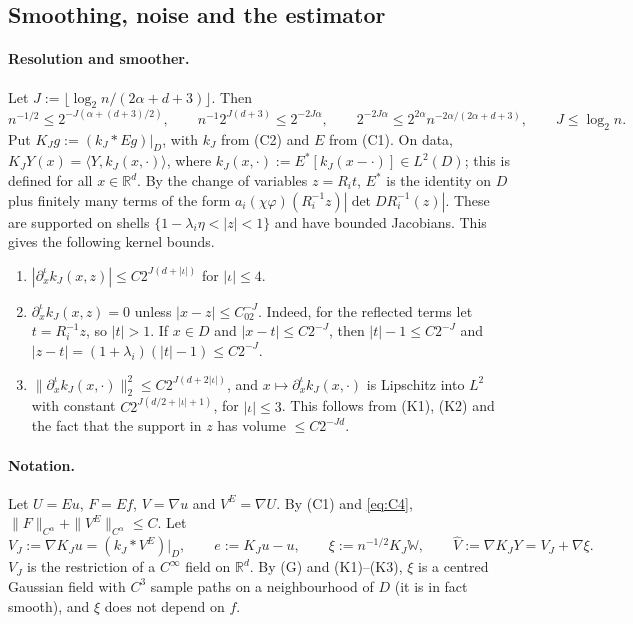 \documentclass[11pt]{article}
\theoremstyle{definition}
\theoremstyle{remark}
\newcommand{\R}{\mathbb R}
\newcommand{\W}{\mathbb W}
\newcommand{\rate}{n^{-2\alpha/(2\alpha+d+3)}}
\begin{document}
\subsection{Smoothing, noise and the estimator}

\paragraph{Resolution and smoother.} Let $J:=\lfloor\log_2n/(2\alpha+d+3)\rfloor$. Then
\begin{equation}\label{eq:J}
n^{-1/2}\le2^{-J(\alpha+(d+3)/2)},\qquad n^{-1}2^{J(d+3)}\le2^{-2J\alpha},\qquad 2^{-2J\alpha}\le 2^{2\alpha}\rate,\qquad J\le\log_2n .
\end{equation}
Put $K_Jg:=(k_J*Eg)|_D$, with $k_J$ from (C2) and $E$ from (C1). On data, $K_JY(x)=\langle Y,k_J(x,\cdot)\rangle$, where $k_J(x,\cdot):=E^*[k_J(x-\cdot)]\in L^2(D)$; this is defined for all $x\in\R^d$. By the change of variables $z=R_it$, $E^*$ is the identity on $D$ plus finitely many terms of the form $a_i(\chi\varphi)(R_i^{-1}z)|\det DR_i^{-1}(z)|$. These are supported on shells $\{1-\lambda_i\eta<|z|<1\}$ and have bounded Jacobians. This gives the following kernel bounds.
\begin{enumerate}[leftmargin=3.2em]
\item[\textbf{(K1)}] $|\partial^\iota_xk_J(x,z)|\le C2^{J(d+|\iota|)}$ for $|\iota|\le4$.
\item[\textbf{(K2)}] $\partial^\iota_xk_J(x,z)=0$ unless $|x-z|\le C_02^{-J}$. Indeed, for the reflected terms let $t=R_i^{-1}z$, so $|t|>1$. If $x\in D$ and $|x-t|\le C2^{-J}$, then $|t|-1\le C2^{-J}$ and $|z-t|=(1+\lambda_i)(|t|-1)\le C2^{-J}$.
\item[\textbf{(K3)}] $\|\partial^\iota_xk_J(x,\cdot)\|^2_2\le C2^{J(d+2|\iota|)}$, and $x\mapsto\partial_x^\iota k_J(x,\cdot)$ is Lipschitz into $L^2$ with constant $C2^{J(d/2+|\iota|+1)}$, for $|\iota|\le3$. This follows from (K1), (K2) and the fact that the support in $z$ has volume $\le C2^{-Jd}$.
\end{enumerate}


\paragraph{Notation.} Let $U=Eu$, $F=Ef$, $V=\nabla u$ and $V^E=\nabla U$. By (C1) and \eqref{eq:C4}, $\|F\|_{C^\alpha}+\|V^E\|_{C^\alpha}\le C$. Let
\[
V_J:=\nabla K_Ju=(k_J*V^E)|_D,\qquad e:=K_Ju-u,\qquad \xi:=n^{-1/2}K_J\W,\qquad\hat V:=\nabla K_JY=V_J+\nabla\xi .
\]
$V_J$ is the restriction of a $C^\infty$ field on $\R^d$. By (G) and (K1)--(K3), $\xi$ is a centred Gaussian field with $C^3$ sample paths on a neighbourhood of $D$ (it is in fact smooth), and $\xi$ does not depend on $f$.
\end{document}
